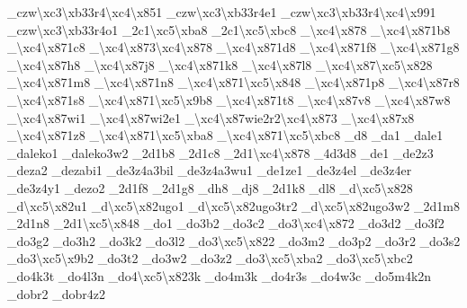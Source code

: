 {\-\_\-czw\textbackslash{}xc3\textbackslash{}xb33r4\textbackslash{}xc4\textbackslash{}x851 \-\_\-czw\textbackslash{}xc3\textbackslash{}xb33r4e1 \-\_\-czw\textbackslash{}xc3\textbackslash{}xb33r4\textbackslash{}xc4\textbackslash{}x991 \-\_\-czw\textbackslash{}xc3\textbackslash{}xb33r4o1 \-\_\-2c1\textbackslash{}xc5\textbackslash{}xba8 \-\_\-2c1\textbackslash{}xc5\textbackslash{}xbc8 \-\_\-\textbackslash{}xc4\textbackslash{}x878 \-\_\textbackslash{}xc4\textbackslash{}x871b8 \-\_\textbackslash{}xc4\textbackslash{}x871c8 \-\_\textbackslash{}xc4\textbackslash{}x873\textbackslash{}xc4\textbackslash{}x878 \-\_\textbackslash{}xc4\textbackslash{}x871d8 \-\_\textbackslash{}xc4\textbackslash{}x871f8 \-\_\textbackslash{}xc4\textbackslash{}x871g8 \-\_\-\textbackslash{}xc4\textbackslash{}x87h8 \-\_\-\textbackslash{}xc4\textbackslash{}x87j8 \-\_\textbackslash{}xc4\textbackslash{}x871k8 \-\_\-\textbackslash{}xc4\textbackslash{}x87l8 \-\_\-\textbackslash{}xc4\textbackslash{}x87\textbackslash{}xc5\textbackslash{}x828 \-\_\textbackslash{}xc4\textbackslash{}x871m8 \-\_\textbackslash{}xc4\textbackslash{}x871n8 \-\_\textbackslash{}xc4\textbackslash{}x871\textbackslash{}xc5\textbackslash{}x848 \-\_\textbackslash{}xc4\textbackslash{}x871p8 \-\_\-\textbackslash{}xc4\textbackslash{}x87r8 \-\_\textbackslash{}xc4\textbackslash{}x871s8 \-\_\textbackslash{}xc4\textbackslash{}x871\textbackslash{}xc5\textbackslash{}x9b8 \-\_\textbackslash{}xc4\textbackslash{}x871t8 \-\_\-\textbackslash{}xc4\textbackslash{}x87v8 \-\_\-\textbackslash{}xc4\textbackslash{}x87w8 \-\_\-\textbackslash{}xc4\textbackslash{}x87wi1 \-\_\-\textbackslash{}xc4\textbackslash{}x87wi2e1 \-\_\-\textbackslash{}xc4\textbackslash{}x87wie2r2\textbackslash{}xc4\textbackslash{}x873 \-\_\-\textbackslash{}xc4\textbackslash{}x87x8 \-\_\textbackslash{}xc4\textbackslash{}x871z8 \-\_\textbackslash{}xc4\textbackslash{}x871\textbackslash{}xc5\textbackslash{}xba8 \-\_\textbackslash{}xc4\textbackslash{}x871\textbackslash{}xc5\textbackslash{}xbc8 \-\_\-d8 \-\_\-da1 \-\_\-dale1 \-\_\-daleko1 \-\_\-daleko3w2 \-\_\-2d1b8 \-\_\-2d1c8 \-\_\-2d1\textbackslash{}xc4\textbackslash{}x878 \-\_\-4d3d8 \-\_\-de1 \-\_\-de2z3 \-\_\-deza2 \-\_\-dezabi1 \-\_\-de3z4a3bil \-\_\-de3z4a3wu1 \-\_\-de1ze1 \-\_\-de3z4el \-\_\-de3z4er \-\_\-de3z4y1 \-\_\-dezo2 \-\_\-2d1f8 \-\_\-2d1g8 \-\_\-dh8 \-\_\-dj8 \-\_\-2d1k8 \-\_\-dl8 \-\_\-d\textbackslash{}xc5\textbackslash{}x828 \-\_\-d\textbackslash{}xc5\textbackslash{}x82u1 \-\_\-d\textbackslash{}xc5\textbackslash{}x82ugo1 \-\_\-d\textbackslash{}xc5\textbackslash{}x82ugo3tr2 \-\_\-d\textbackslash{}xc5\textbackslash{}x82ugo3w2 \-\_\-2d1m8 \-\_\-2d1n8 \-\_\-2d1\textbackslash{}xc5\textbackslash{}x848 \-\_\-do1 \-\_\-do3b2 \-\_\-do3c2 \-\_\-do3\textbackslash{}xc4\textbackslash{}x872 \-\_\-do3d2 \-\_\-do3f2 \-\_\-do3g2 \-\_\-do3h2 \-\_\-do3k2 \-\_\-do3l2 \-\_\-do3\textbackslash{}xc5\textbackslash{}x822 \-\_\-do3m2 \-\_\-do3p2 \-\_\-do3r2 \-\_\-do3s2 \-\_\-do3\textbackslash{}xc5\textbackslash{}x9b2 \-\_\-do3t2 \-\_\-do3w2 \-\_\-do3z2 \-\_\-do3\textbackslash{}xc5\textbackslash{}xba2 \-\_\-do3\textbackslash{}xc5\textbackslash{}xbc2 \-\_\-do4k3t \-\_\-do4l3n \-\_\-do4\textbackslash{}xc5\textbackslash{}x823k \-\_\-do4m3k \-\_\-do4r3s \-\_\-do4w3c \-\_\-do5m4k2n \-\_\-dobr2 \-\_\-dobr4z2 }
